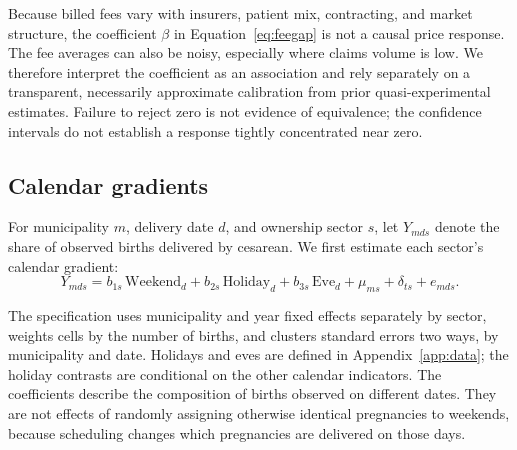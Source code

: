 \documentclass[12pt]{article}
\begin{document}
Because billed fees vary with insurers, patient mix, contracting, and market structure, the coefficient $\beta$ in Equation~\eqref{eq:feegap} is not a causal price response. The fee averages can also be noisy, especially where claims volume is low. We therefore interpret the coefficient as an association and rely separately on a transparent, necessarily approximate calibration from prior quasi-experimental estimates. Failure to reject zero is not evidence of equivalence; the confidence intervals do not establish a response tightly concentrated near zero.

\subsection{Calendar gradients}

For municipality $m$, delivery date $d$, and ownership sector $s$, let \(Y_{mds}\) denote the share of observed births delivered by cesarean. We first estimate each sector's calendar gradient:
\begin{equation}
Y_{mds}=b_{1s}\,\mathrm{Weekend}_d+b_{2s}\,\mathrm{Holiday}_d+
 b_{3s}\,\mathrm{Eve}_d+\mu_{ms}+\delta_{ts}+e_{mds}.
\label{eq:scheduling}
\end{equation}

The specification uses municipality and year fixed effects separately by sector, weights cells by the number of births, and clusters standard errors two ways, by municipality and date. Holidays and eves are defined in Appendix~\ref{app:data}; the holiday contrasts are conditional on the other calendar indicators. The coefficients describe the composition of births observed on different dates. They are not effects of randomly assigning otherwise identical pregnancies to weekends, because scheduling changes which pregnancies are delivered on those days.
\end{document}
